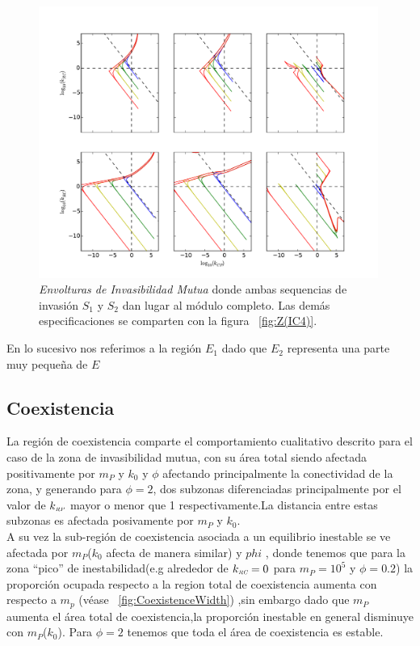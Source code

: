 \begin{figure}
  \centering
  \includegraphics[width = 0.99\textwidth]{./Plots/MutualInvAcGrGr.pdf}
  \caption[Env $I_M$]{\emph{Envolturas de Invasibilidad Mutua} donde ambas sequencias de invasi\'on $S_1$ y $S_2$ dan lugar al m\'odulo completo. Las dem\'as especificaciones se comparten con la figura ~\ref{fig:Z(IC4)}.}
  \label{fig:MutualInv}
\end{figure}


En lo sucesivo nos referimos a la regi\'on $E_1$ dado que $E_2$ representa una parte muy peque\~na de $E$

\subsection{Coexistencia}

La regi\'on de coexistencia comparte el comportamiento cualitativo descrito para el caso de la zona de invasibilidad mutua, con su \'area total siendo afectada positivamente por $m_P$ y $k_0$ y $\phi$ afectando principalmente la conectividad de la zona, y generando para $\phi = 2$, dos subzonas diferenciadas principalmente por el valor de $k_{\textit{\tiny RP}}$ mayor o menor que 1 respectivamente.La distancia entre estas subzonas es afectada posivamente por $m_P$ y $k_0$. \\

A su vez la sub-regi\'on de coexistencia asociada a un equilibrio inestable se ve afectada por $m_P$($k_0$ afecta de manera similar) y $phi$ , donde tenemos que para la zona ``pico'' de inestabilidad(e.g alrededor de $k_{\textit{\tiny RC}} = 0$ para $m_P = 10^5$ y $\phi = 0.2$) la proporci\'on ocupada respecto a la region total de coexistencia aumenta con respecto a $m_p$ (v\'ease ~\ref{fig:CoexistenceWidth}) ,sin embargo dado que $m_P$ aumenta el \'area total de coexistencia,la proporci\'on inestable en general disminuye con $m_P$($k_0$). Para $\phi = 2$ tenemos que toda el \'area de coexistencia es estable.

